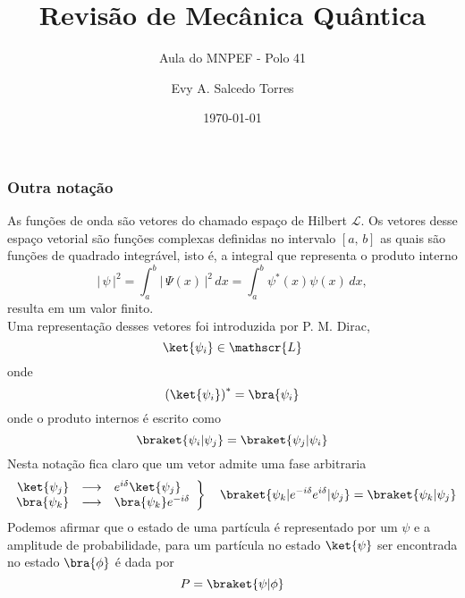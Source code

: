 \documentclass[12pt,brazil,table]{beamer}
\title{Revisão de Mecânica Quântica}
\subtitle{Aula do MNPEF - Polo 41}
\author{Evy A. Salcedo Torres}
\date{\today}
\begin{document}

\begin{frame}
  \titlepage
\end{frame}



\begin{frame}
  \frametitle{Outra notação}
  \fontsize{7pt}{11pt}\selectfont
  
  As funções de onda são vetores do chamado espaço de Hilbert $\mathscr{L}$. Os vetores desse espaço vetorial são funções complexas definidas no intervalo $[a,\, b]$ as quais são funções de quadrado integrável, isto é, a integral que representa o produto interno 
  \[
   \left|\,\psi \, \right|^2 = \int_a^b \left| \, \Psi(x)  \, \right|^2\,dx = \int_a^b \psi^*(x) \psi(x)\, dx,
  \]
  resulta em um valor finito.\\  
  Uma representação desses vetores foi introduzida por P. M. Dirac,
  \[
   \ket{\psi_i} \in \mathscr{L}
  \]
  onde
  \[
   \left(\ket{\psi_i}\right)^*=\bra{\psi_i}
  \]
  onde o produto internos é escrito como
  \[
   \braket{\psi_i|\psi_j} = \braket{\psi_j|\psi_i}
  \]
  Nesta notação fica claro que um vetor admite uma fase arbitraria
  \[
    \left.\begin{array}{rcl}
      \ket{\psi_j} & \longrightarrow & e^{i\delta}\ket{\psi_j}\\
      \bra{\psi_k} & \longrightarrow & \bra{\psi_k}e^{-i\delta}
    \end{array}\right\} \quad \braket{\psi_k|e^{-i\delta}e^{i\delta}|\psi_j}=\braket{\psi_k|\psi_j}
  \]
  Podemos afirmar que o estado de uma partícula é representado por um ${\psi}$ e a amplitude de probabilidade, para um partícula no estado $\ket{\psi}$ ser encontrada no estado $\bra{\phi}$ é dada por
  \[
   P = \braket{\psi|\phi}
  \]
     
\end{frame} 

\end{document}
